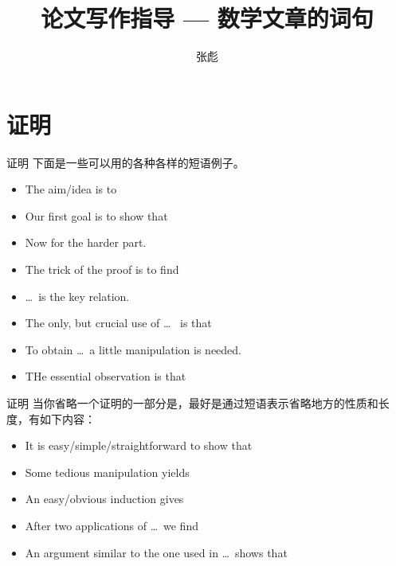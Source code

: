 \documentclass{ctexbeamer}
\begin{document}
\title[]{论文写作指导 --- 数学文章的词句}
\author[]{{\large 张彪} }

\date{}






\begin{frame}
\maketitle
\end{frame}


\section{证明}



\begin{frame}{证明}
	下面是一些可以用的各种各样的短语例子。
	\begin{itemize}
		\item The aim/idea is to 
		\item Our first goal is to show that 
		\item Now for the harder part.
		\item The trick of the proof is to find
		\item \dots ~is the key relation.
		\item The only, but crucial use of  \dots~ is that 
		\item To obtain \dots ~a little manipulation is needed.
		\item THe essential observation is that 
	\end{itemize}
\end{frame}


\begin{frame}{证明}
	当你省略一个证明的一部分是，最好是通过短语表示省略地方的性质和长度，有如下内容：
	\begin{itemize}
		\item It is easy/simple/straightforward to show that 
		\item Some tedious manipulation yields
		\item An easy/obvious induction gives 
		\item After two applications of  \dots ~we find
		\item An argument similar to the one used in  \dots ~shows that 
	\end{itemize}
\end{frame}
\end{document}
